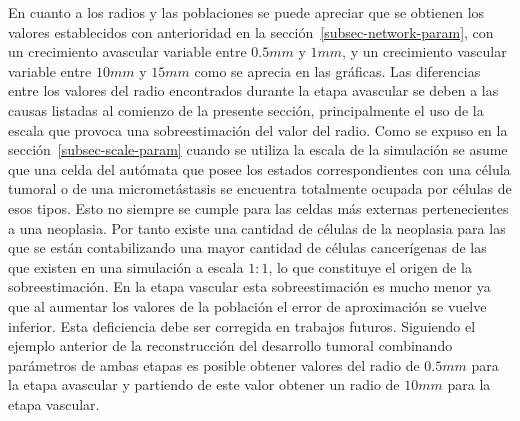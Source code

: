 En cuanto a los radios y las poblaciones se puede apreciar que se obtienen los valores establecidos con anterioridad en la secci\'on~\ref{subsec-network-param}, con un crecimiento avascular variable entre $0$.$5mm$ y $1mm$, y un crecimiento vascular variable entre $10mm$ y $15mm$ como se aprecia en las gr\'aficas. Las diferencias entre los valores del radio encontrados durante la etapa avascular se deben a las causas listadas al comienzo de la presente secci\'on, principalmente el uso de la escala que provoca una sobreestimaci\'on del valor del radio. Como se expuso en la secci\'on~\ref{subsec-scale-param} cuando se utiliza la escala de la simulaci\'on se asume que una celda del aut\'omata que posee los estados correspondientes con una c\'elula tumoral o de una micromet\'astasis se encuentra totalmente ocupada por c\'elulas de esos tipos. Esto no siempre se cumple para las celdas m\'as externas pertenecientes a una neoplasia. Por tanto existe una cantidad de c\'elulas de la neoplasia para las que se est\'an contabilizando una mayor cantidad de c\'elulas cancer\'igenas de las que existen en una simulaci\'on a escala $1:1$, lo que constituye el origen de la sobreestimaci\'on. En la etapa vascular esta sobreestimaci\'on es mucho menor ya que al aumentar los valores de la poblaci\'on el error de aproximaci\'on se vuelve inferior. Esta deficiencia debe ser corregida en trabajos futuros. Siguiendo el ejemplo anterior de la reconstrucci\'on del desarrollo tumoral combinando par\'ametros de ambas etapas es posible obtener valores del radio de $0$.$5mm$ para la etapa avascular y partiendo de este valor obtener un radio de $10mm$ para la etapa vascular.

